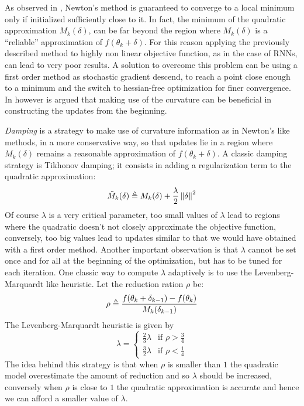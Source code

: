 As observed in \cite{hessianFree}, Newton's method is guaranteed to converge to a local minimum only if initialized sufficiently close to it.
In fact, the minimum of the quadratic approximation $M_k(\delta)$, can be far beyond the region where $M_k(\delta)$ is  a ``reliable'' approximation of $f(\theta_k+\delta)$.
For this reason applying the previously described method to highly non linear objective function, as in the case of RNNs, can lead to very poor results.
A solution to overcome this problem can be using a first order method as stochastic gradient descend, to reach a point close enough to a minimum and the switch to hessian-free optimization for finer convergence. In \cite{hessianFree} however is argued that making use of the curvature can be beneficial in constructing the updates from the beginning.

\textit{Damping} is a strategy to make use of curvature information as in Newton's like methods, in a more conservative way, so that updates lie in a region where $M_k(\delta)$ remains a reasonable approximation of $f(\theta_k+\delta)$. 
A classic damping strategy is Tikhonov damping; it consists in adding a regularization term to the quadratic approximation:
\begin{equation}
 \tilde{M}_k(\delta) \triangleq  M_k(\delta) + \frac{\lambda}{2} \left\Vert \delta \right\Vert^2
\end{equation}
Of course $\lambda$ is a very critical parameter, too small values of $\lambda$ lead to regions where the quadratic doesn't not closely approximate the objective function, conversely, too big values lead to updates similar to that we would have obtained with a first order method. Another important observation is that $\lambda$ cannot be set once and for all at the beginning of the optimization, but has to be tuned for each iteration. One classic way to compute $\lambda$ adaptively is to use the Levenberg-Marquardt like heuristic.
Let the reduction ration $\rho$ be:
\begin{equation}
 \rho \triangleq \frac{f(\theta_k + \delta_{k-1})-f(\theta_k)}{M_k(\delta_{k-1})}
\end{equation}
The Levenberg-Marquardt  heuristic is given by
\begin{equation} 
 \lambda = 
 \begin{cases} 
    \frac{2}{3}\lambda &\mbox{if } \rho > \frac{3}{4} \\ 
    \frac{3}{2}\lambda &\mbox{if } \rho < \frac{1}{4} 
  \end{cases} 
\end{equation}
The idea behind this strategy is that when $\rho$ is smaller than $1$ the quadratic model overestimate the amount of reduction and so $\lambda$ should be increased, conversely when $\rho$ is close to $1$ the quadratic approximation is accurate and hence we can afford a smaller value of $\lambda$.

